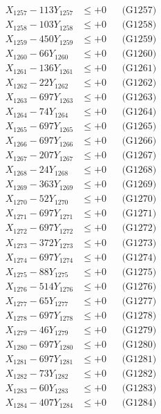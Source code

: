 \documentclass[a4paper,10pt]{article}
\begin{document}
{\begin{align}
X_{1257} - 113Y_{1257} &\leq +0 && \text{(G1257)} \\
X_{1258} - 103Y_{1258} &\leq +0 && \text{(G1258)} \\
X_{1259} - 450Y_{1259} &\leq +0 && \text{(G1259)} \\
X_{1260} - 66Y_{1260} &\leq +0 && \text{(G1260)} \\
\allowbreak
X_{1261} - 136Y_{1261} &\leq +0 && \text{(G1261)} \\
X_{1262} - 22Y_{1262} &\leq +0 && \text{(G1262)} \\
X_{1263} - 697Y_{1263} &\leq +0 && \text{(G1263)} \\
X_{1264} - 74Y_{1264} &\leq +0 && \text{(G1264)} \\
X_{1265} - 697Y_{1265} &\leq +0 && \text{(G1265)} \\
X_{1266} - 697Y_{1266} &\leq +0 && \text{(G1266)} \\
X_{1267} - 207Y_{1267} &\leq +0 && \text{(G1267)} \\
X_{1268} - 24Y_{1268} &\leq +0 && \text{(G1268)} \\
X_{1269} - 363Y_{1269} &\leq +0 && \text{(G1269)} \\
X_{1270} - 52Y_{1270} &\leq +0 && \text{(G1270)} \\
\allowbreak
X_{1271} - 697Y_{1271} &\leq +0 && \text{(G1271)} \\
X_{1272} - 697Y_{1272} &\leq +0 && \text{(G1272)} \\
X_{1273} - 372Y_{1273} &\leq +0 && \text{(G1273)} \\
X_{1274} - 697Y_{1274} &\leq +0 && \text{(G1274)} \\
X_{1275} - 88Y_{1275} &\leq +0 && \text{(G1275)} \\
X_{1276} - 514Y_{1276} &\leq +0 && \text{(G1276)} \\
X_{1277} - 65Y_{1277} &\leq +0 && \text{(G1277)} \\
X_{1278} - 697Y_{1278} &\leq +0 && \text{(G1278)} \\
X_{1279} - 46Y_{1279} &\leq +0 && \text{(G1279)} \\
X_{1280} - 697Y_{1280} &\leq +0 && \text{(G1280)} \\
\allowbreak
X_{1281} - 697Y_{1281} &\leq +0 && \text{(G1281)} \\
X_{1282} - 73Y_{1282} &\leq +0 && \text{(G1282)} \\
X_{1283} - 60Y_{1283} &\leq +0 && \text{(G1283)} \\
X_{1284} - 407Y_{1284} &\leq +0 && \text{(G1284)} \\

\end{align}}
\end{document}
